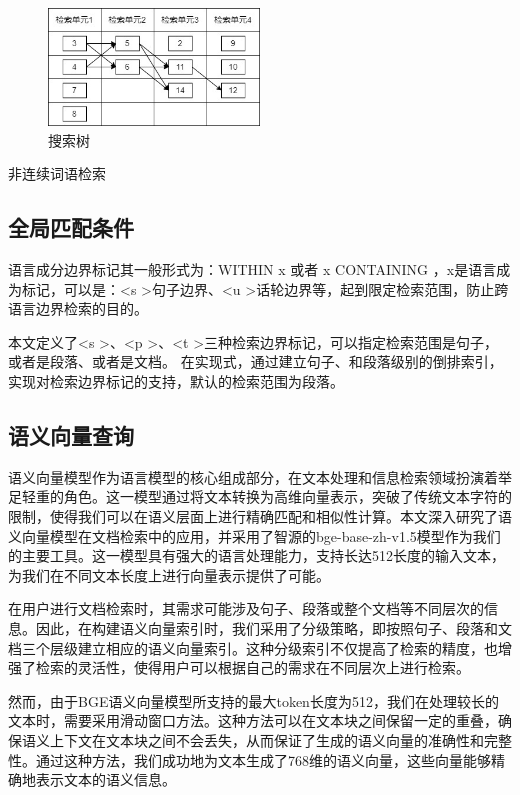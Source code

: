 \documentclass[11pt]{article}
\begin{document}
\begin{CJK*}{UTF8}{gbsn}
\begin{figure}[h]
	\centering
	\includegraphics[width=0.5\textwidth]{dy.jpg}
	\caption{搜索树}
\end{figure}
非连续词语检索

\subsection{全局匹配条件}

语言成分边界标记其一般形式为：WITHIN x 或者 x CONTAINING ，x是语言成为标记，可以是：\textless s \textgreater 句子边界、\textless u \textgreater 话轮边界等，起到限定检索范围，防止跨语言边界检索的目的。

本文定义了\textless s \textgreater、\textless p \textgreater 、\textless t \textgreater 三种检索边界标记，可以指定检索范围是句子，或者是段落、或者是文档。
在实现式，通过建立句子、和段落级别的倒排索引，实现对检索边界标记的支持，默认的检索范围为段落。


\subsection{语义向量查询}

语义向量模型作为语言模型的核心组成部分，在文本处理和信息检索领域扮演着举足轻重的角色。这一模型通过将文本转换为高维向量表示，突破了传统文本字符的限制，使得我们可以在语义层面上进行精确匹配和相似性计算。本文深入研究了语义向量模型在文档检索中的应用，并采用了智源的bge-base-zh-v1.5模型作为我们的主要工具。这一模型具有强大的语言处理能力，支持长达512长度的输入文本，为我们在不同文本长度上进行向量表示提供了可能。

在用户进行文档检索时，其需求可能涉及句子、段落或整个文档等不同层次的信息。因此，在构建语义向量索引时，我们采用了分级策略，即按照句子、段落和文档三个层级建立相应的语义向量索引。这种分级索引不仅提高了检索的精度，也增强了检索的灵活性，使得用户可以根据自己的需求在不同层次上进行检索。

然而，由于BGE语义向量模型所支持的最大token长度为512，我们在处理较长的文本时，需要采用滑动窗口方法。这种方法可以在文本块之间保留一定的重叠，确保语义上下文在文本块之间不会丢失，从而保证了生成的语义向量的准确性和完整性。通过这种方法，我们成功地为文本生成了768维的语义向量，这些向量能够精确地表示文本的语义信息。


\end{CJK*}
\end{document}
